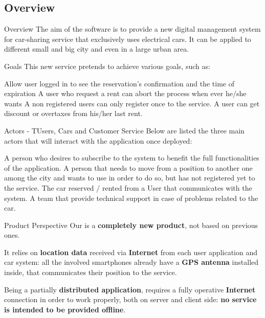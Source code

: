 \documentclass{../Common/Structure/pdf_presentation}
\begin{document}
	\subsection{Overview}
	\begin{frame}{Overview}
		The aim of the software is to provide a new digital management system for car-sharing service that exclusively uses
		electrical cars. It can be applied to different small and big city and even in a large urban area.
	\end{frame}
	\begin{frame}{Goals}
		This new service pretends to achieve various goals, such as:
		\begin{itemize}
			 Allow user logged in to see the reservation's confirmation and the time of expiration
			 A user who request a rent can abort the process when ever he/she wants
			 A non registered users can only register once to the service.
			 A user can get discount or overtaxes from his/her last rent.
		\end{itemize}
	\end{frame}
	\begin{frame}{Actors - TUsers, Cars and Customer Service}
		Below are listed the three main actors that will interact with the application once deployed:
		\begin{itemize}
			 A person who desires to subscribe to the system to benefit the full functionalities of the application.
			 A person that needs to move from a position	to another one among the city and wants to use \PowerEnJoy{} in order to do so, but has not registered yet to the service.
			 The car reserved / rented from a User that communicates with the system.
			 A team that provide technical support in case of problems related to the car.
		\end{itemize}
	\end{frame}
	\begin{frame}{Product Perspective}
		Our \PowerEnJoy{} is a \textbf{completely new product}, not based on previous ones.\par
		It relies on \textbf{location data} received via \textbf{Internet} from each user application and car system: all the involved smartphones already have a \textbf{GPS antenna} installed inside, that communicates their position to the service.\par
		Being a partially \textbf{distributed application}, \PowerEnJoy{} requires a fully operative \textbf{Internet} connection in order to work properly, both on server and client side: \textbf{no service is intended to be provided offline}.
	\end{frame}
\end{document}
